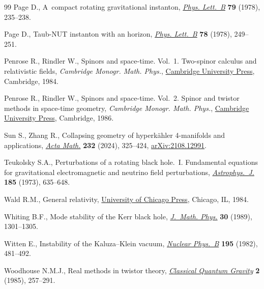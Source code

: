 \begin{thebibliography}{99}
Page D., A~compact rotating gravitational instanton, \href{https://doi.org/10.1016/0370-2693(78)90231-9}{\textit{Phys. Lett.~B}}
 \textbf{79} (1978), 235--238.

Page D., Taub-{NUT} instanton with an horizon, \href{https://doi.org/10.1016/0370-2693(78)90016-3}{\textit{Phys. Lett.~B}}
 \textbf{78} (1978), 249--251.

Penrose R., Rindler W., Spinors and space-time. {V}ol.~1. {T}wo-spinor calculus
 and relativistic fields, \textit{Cambridge Monogr. Math. Phys.}, \href{https://doi.org/10.1017/CBO9780511564048}{Cambridge University
 Press}, Cambridge, 1984.

Penrose R., Rindler W., Spinors and space-time. {V}ol.~2. Spinor and twistor
 methods in space-time geometry, \textit{Cambridge Monogr. Math. Phys.}, \href{https://doi.org/10.1017/CBO9780511524486}{Cambridge
 University Press}, Cambridge, 1986.

Sun S., Zhang R., Collapsing geometry of hyperk\"ahler 4-manifolds and
 applications, \href{https://doi.org/10.4310/acta.2024.v232.n2.a2}{\textit{Acta Math.}} \textbf{232} (2024), 325--424,
 \href{https://arxiv.org/abs/2108.12991}{arXiv:2108.12991}.

Teukolsky S.A., Perturbations of a rotating black hole.~{I}. Fundamental
 equations for gravitational electromagnetic and neutrino field perturbations,
 \href{https://doi.org/10.1086/152444}{\textit{Astrophys.~J.}} \textbf{185} (1973), 635--648.

Wald R.M., General relativity, \href{https://doi.org/10.7208/chicago/9780226870373.001.0001}{University of Chicago Press}, Chicago, IL, 1984.

Whiting B.F., Mode stability of the {K}err black hole, \href{https://doi.org/10.1063/1.528308}{\textit{J.~Math. Phys.}}
 \textbf{30} (1989), 1301--1305.

Witten E., Instability of the {K}aluza--{K}lein vacuum, \href{https://doi.org/10.1016/0550-3213(82)90007-4}{\textit{Nuclear
 Phys.~B}} \textbf{195} (1982), 481--492.

Woodhouse N.M.J., Real methods in twistor theory, \href{https://doi.org/10.1088/0264-9381/2/3/006}{\textit{Classical Quantum
 Gravity}} \textbf{2} (1985), 257--291.

\end{thebibliography}
